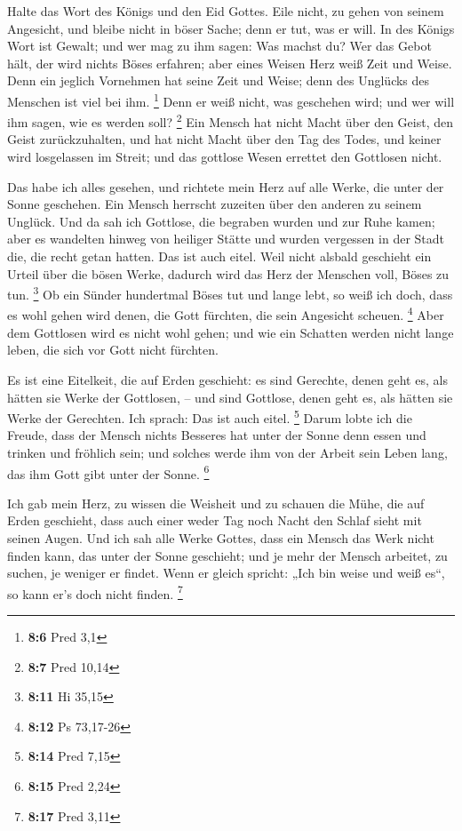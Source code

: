  Halte das Wort des Königs und den Eid Gottes.
 Eile nicht, zu gehen von seinem Angesicht, und bleibe
nicht in böser Sache; denn er tut, was er will.  In des
Königs Wort ist Gewalt; und wer mag zu ihm sagen: Was machst du?
 Wer das Gebot hält, der wird nichts Böses erfahren; aber
eines Weisen Herz weiß Zeit und Weise.  Denn ein jeglich
Vornehmen hat seine Zeit und Weise; denn des Unglücks des Menschen ist
viel bei ihm. \footnote{\textbf{8:6} Pred 3,1}  Denn er
weiß nicht, was geschehen wird; und wer will ihm sagen, wie es werden
soll? \footnote{\textbf{8:7} Pred 10,14}  Ein Mensch hat
nicht Macht über den Geist, den Geist zurückzuhalten, und hat nicht
Macht über den Tag des Todes, und keiner wird losgelassen im Streit; und
das gottlose Wesen errettet den Gottlosen nicht.

 Das habe ich alles gesehen, und richtete mein Herz auf
alle Werke, die unter der Sonne geschehen. Ein Mensch herrscht zuzeiten
über den anderen zu seinem Unglück.  Und da sah ich
Gottlose, die begraben wurden und zur Ruhe kamen; aber es wandelten
hinweg von heiliger Stätte und wurden vergessen in der Stadt die, die
recht getan hatten. Das ist auch eitel.  Weil nicht
alsbald geschieht ein Urteil über die bösen Werke, dadurch wird das Herz
der Menschen voll, Böses zu tun. \footnote{\textbf{8:11} Hi 35,15}
 Ob ein Sünder hundertmal Böses tut und lange lebt, so
weiß ich doch, dass es wohl gehen wird denen, die Gott fürchten, die
sein Angesicht scheuen. \footnote{\textbf{8:12} Ps 73,17-26}
 Aber dem Gottlosen wird es nicht wohl gehen; und wie ein
Schatten werden nicht lange leben, die sich vor Gott nicht fürchten.

 Es ist eine Eitelkeit, die auf Erden geschieht: es sind
Gerechte, denen geht es, als hätten sie Werke der Gottlosen, -- und sind
Gottlose, denen geht es, als hätten sie Werke der Gerechten. Ich sprach:
Das ist auch eitel. \footnote{\textbf{8:14} Pred 7,15} 
Darum lobte ich die Freude, dass der Mensch nichts Besseres hat unter
der Sonne denn essen und trinken und fröhlich sein; und solches werde
ihm von der Arbeit sein Leben lang, das ihm Gott gibt unter der Sonne.
\footnote{\textbf{8:15} Pred 2,24}

 Ich gab mein Herz, zu wissen die Weisheit und zu schauen
die Mühe, die auf Erden geschieht, dass auch einer weder Tag noch Nacht
den Schlaf sieht mit seinen Augen.  Und ich sah alle
Werke Gottes, dass ein Mensch das Werk nicht finden kann, das unter der
Sonne geschieht; und je mehr der Mensch arbeitet, zu suchen, je weniger
er findet. Wenn er gleich spricht: „Ich bin weise und weiß es``, so kann
er's doch nicht finden. \footnote{\textbf{8:17} Pred 3,11}

